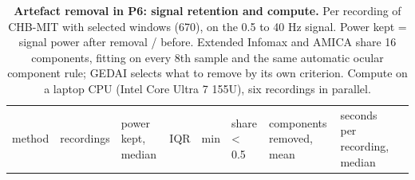 \documentclass[11pt,a4paper]{article}
\begin{document}
\begin{longtable}[]{@{}
  >{\raggedright\arraybackslash}p{}
  >{\raggedright\arraybackslash}p{}
  >{\raggedright\arraybackslash}p{}
  >{\raggedright\arraybackslash}p{}
  >{\raggedright\arraybackslash}p{}
  >{\raggedright\arraybackslash}p{}
  >{\raggedright\arraybackslash}p{}
  >{\raggedright\arraybackslash}p{}
  >{\raggedright\arraybackslash}p{}@{}}
\caption{\textbf{Artefact removal in P6: signal retention and compute.} Per recording of CHB-MIT with selected windows (670), on the 0.5 to 40 Hz signal. Power kept = signal power after removal / before. Extended Infomax and AMICA share 16 components, fitting on every 8th sample and the same automatic ocular component rule; GEDAI selects what to remove by its own criterion. Compute on a laptop CPU (Intel Core Ultra 7 155U), six recordings in parallel.}\tabularnewline
\toprule\noalign{}
\begin{minipage}[b]{\linewidth}\raggedright
method
\end{minipage} & \begin{minipage}[b]{\linewidth}\raggedright
recordings
\end{minipage} & \begin{minipage}[b]{\linewidth}\raggedright
power kept, median
\end{minipage} & \begin{minipage}[b]{\linewidth}\raggedright
IQR
\end{minipage} & \begin{minipage}[b]{\linewidth}\raggedright
min
\end{minipage} & \begin{minipage}[b]{\linewidth}\raggedright
share \textless{} 0.5
\end{minipage} & \begin{minipage}[b]{\linewidth}\raggedright
components removed, mean
\end{minipage} & \begin{minipage}[b]{\linewidth}\raggedright
seconds per recording, median
\end{minipage} & \begin{minipage}[b]{\linewidth}\raggedright

\end{minipage}
\end{longtable}
\end{document}
